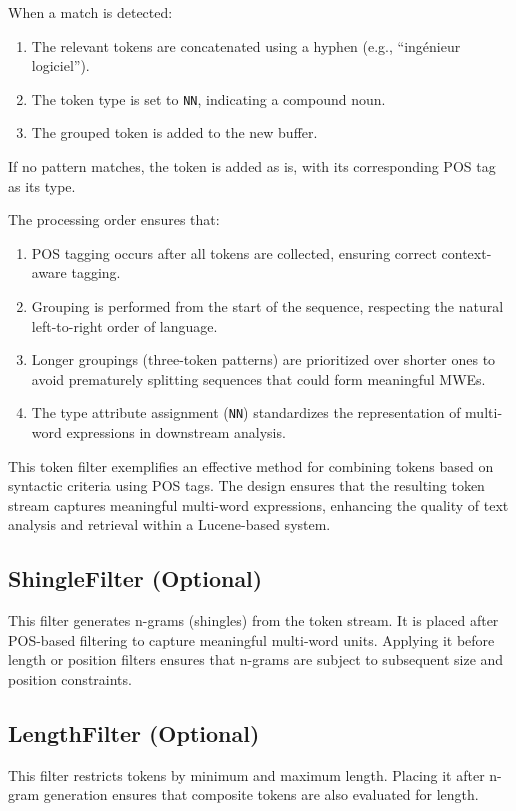 When a match is detected:
\begin{enumerate}
    \item The relevant tokens are concatenated using a hyphen (e.g., ``ingénieur logiciel'').
    \item The token type is set to \texttt{NN}, indicating a compound noun.
    \item The grouped token is added to the new buffer.
\end{enumerate}
If no pattern matches, the token is added as is, with its corresponding POS tag as its type.


The processing order ensures that:
\begin{enumerate}
    \item POS tagging occurs after all tokens are collected, ensuring correct context-aware tagging.
    \item Grouping is performed from the start of the sequence, respecting the natural left-to-right order of language.
    \item Longer groupings (three-token patterns) are prioritized over shorter ones to avoid prematurely splitting sequences that could form meaningful MWEs.
    \item The type attribute assignment (\texttt{NN}) standardizes the representation of multi-word expressions in downstream analysis.
\end{enumerate}

This token filter exemplifies an effective method for combining tokens based on syntactic criteria using POS tags. The design ensures that the resulting token stream captures meaningful multi-word expressions, enhancing the quality of text analysis and retrieval within a Lucene-based system.


\subsection{ShingleFilter (Optional)}
This filter generates n-grams (shingles) from the token stream. It is placed after POS-based filtering to capture meaningful multi-word units. Applying it before length or position filters ensures that n-grams are subject to subsequent size and position constraints.

\subsection{LengthFilter (Optional)}
This filter restricts tokens by minimum and maximum length. Placing it after n-gram generation ensures that composite tokens are also evaluated for length.

